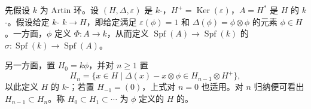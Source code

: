 先假设 $k$ 为 Artin 环。设 $(H,\Delta,\varepsilon)$ 是 $k$-，$H^+=\operatorname{Ker}(\varepsilon)$，$A=H^*$ 是 $H$ 的 $k$-。假设给定 $k$- $k\to H$，即给定满足 $\varepsilon(\phi)=1$ 和 $\Delta(\phi)=\phi\otimes\phi$ 的元素 $\phi\in H$。一方面，$\phi$ 定义 $\Phi:A\to k$，从而定义 $\operatorname{Spf}(A)\to\operatorname{Spf}(k)$ 的 $\sigma:\operatorname{Spf}(k)\to\operatorname{Spf}(A)$。

另一方面，置 $H_0=k\phi$，并对 $n\geq1$ 置
\[
 H_n=\{x\in H\mid\Delta(x)-x\otimes\phi\in H_{n-1}\otimes H^+\},
\]
以此定义 $H$ 的 $k$-；若置 $H_{-1}=(0)$，上式对 $n=0$ 也适用。对 $n$ 归纳便可看出 $H_{n-1}\subset H_n$。称 $H_0\subset H_1\subset\cdots$ 为 $\phi$ 定义的 $H$ 的。

